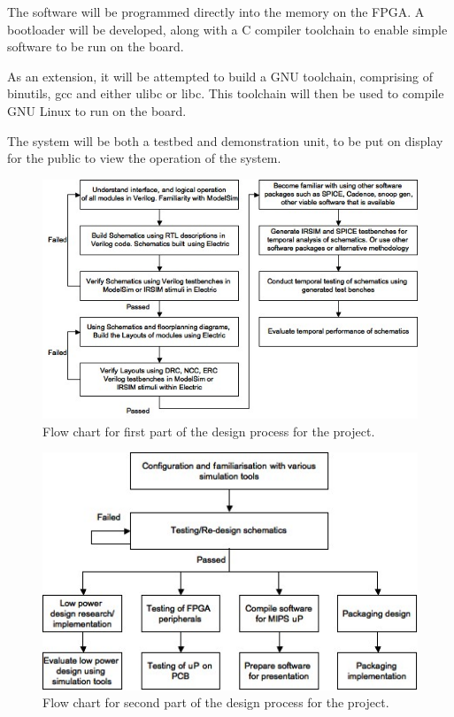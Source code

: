 The software will be programmed directly into the memory on the FPGA. A bootloader will be developed, along with a C compiler toolchain to enable simple software to be run on the board.

As an extension, it will be attempted to build a GNU toolchain, comprising of binutils, gcc and either ulibc or libc. This toolchain will then be used to compile GNU Linux to run on the board.

The system will be both a testbed and demonstration unit, to be put on display for the public to view the operation of the system.

\begin{figure}
\centering 
\includegraphics[width=\textwidth]{designflowA.jpg}
\caption{Flow chart for first part of the design process for the project.}
\label{designflowA}
\end{figure}

\begin{figure}
\centering 
\includegraphics[width=\textwidth]{designflowB.jpg}
\caption{Flow chart for second part of the design process for the project.}
\label{designflowB}
\end{figure}
